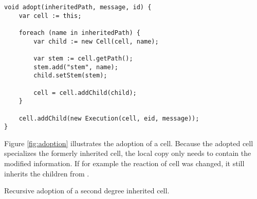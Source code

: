 \begin{lstlisting}[mathescape, float=htbp, label=lst:adopt, 
caption=Method to adopt executions of inherited cells]
void adopt(inheritedPath, message, id) {
	var cell := this;

	foreach (name in inheritedPath) {
		var child := new Cell(cell, name);

		var stem := cell.getPath();
		stem.add("stem", name);
		child.setStem(stem);

		cell = cell.addChild(child);
	}
	
	cell.addChild(new Execution(cell, eid, message));
}
\end{lstlisting}

Figure \ref{fig:adoption} illustrates the adoption of a cell. Because the adopted cell specializes the formerly inherited cell, the local copy only needs to contain the modified information. If for example the reaction of cell  was changed, it still inherits the children from .

{Recursive adoption of a second degree inherited cell.}
